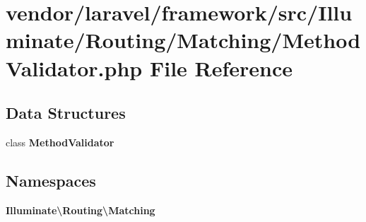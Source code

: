\section{vendor/laravel/framework/src/\+Illuminate/\+Routing/\+Matching/\+Method\+Validator.php File Reference}
\label{_method_validator_8php}
\subsection*{Data Structures}
\begin{DoxyCompactItemize}
\item 
class {\bf Method\+Validator}
\end{DoxyCompactItemize}
\subsection*{Namespaces}
\begin{DoxyCompactItemize}
\item 
 {\bf Illuminate\textbackslash{}\+Routing\textbackslash{}\+Matching}
\end{DoxyCompactItemize}
